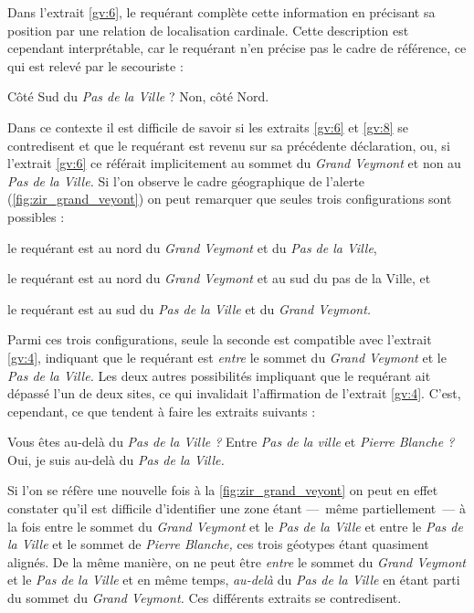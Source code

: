 Dans l'extrait \ref{gv:6}, le requérant complète cette information en
précisant sa position par une relation de localisation
cardinale. Cette description est cependant interprétable, car le
requérant n'en précise pas le cadre de référence, ce qui est relevé
par le secouriste :
%
\begin{dialogue*}
  \Sec {} Côté Sud du \emph{Pas de la Ville} ?
%
  \Req {} Non, côté Nord.
\end{dialogue*}
%
Dans ce contexte il est difficile de savoir si les extraits \ref{gv:6}
et \ref{gv:8} se contredisent et que le requérant est revenu sur sa
précédente déclaration, ou, si l'extrait \ref{gv:6} ce référait
implicitement au sommet du \emph{Grand Veymont} et non au \emph{Pas de
  la Ville.} Si l'on observe le cadre géographique de l'alerte
(\autoref{fig:zir_grand_veyont}) on peut remarquer que seules trois
configurations sont possibles :
%
\begin{enumerate*}[label=(\arabic*)]
\item le requérant est au nord du \emph{Grand Veymont} et du \emph{Pas
    de la Ville},
\item le requérant est au nord du \emph{Grand Veymont} et au sud du
  pas de la Ville, et
\item le requérant est au sud du \emph{Pas de la Ville} et du
  \emph{Grand Veymont.}
\end{enumerate*}
%
Parmi ces trois configurations, seule la seconde est compatible avec
l'extrait \ref{gv:4}, indiquant que le requérant est \emph{entre} le
sommet du \emph{Grand Veymont} et le \emph{Pas de la Ville.} Les deux
autres possibilités impliquant que le requérant ait dépassé l'un de
deux sites, ce qui invalidait l'affirmation de l'extrait
\ref{gv:4}. C'est, cependant, ce que tendent à faire les extraits
suivants :
%
\begin{dialogue*}
  \Sec {} Vous êtes au-delà du \emph{Pas de la Ville ?}
   Entre \emph{Pas de la ville} et \emph{Pierre
    Blanche ?}
  \Req {} Oui, je suis au-delà du \emph{Pas de la
    Ville.}
\end{dialogue*}
%
Si l'on se réfère une nouvelle fois à la
\autoref{fig:zir_grand_veyont} on peut en effet constater qu'il est
difficile d'identifier une zone étant ---~même partiellement~--- à la
fois entre le sommet du \emph{Grand Veymont} et le \emph{Pas de la
  Ville} et entre le \emph{Pas de la Ville} et le sommet de
\emph{Pierre Blanche,} ces trois géotypes étant quasiment alignés. De
la même manière, on ne peut être \emph{entre} le sommet du \emph{Grand
  Veymont} et le \emph{Pas de la Ville} et en même temps,
\emph{au-delà} du \emph{Pas de la Ville} en étant parti du sommet du
\emph{Grand Veymont.} Ces différents extraits se contredisent.

